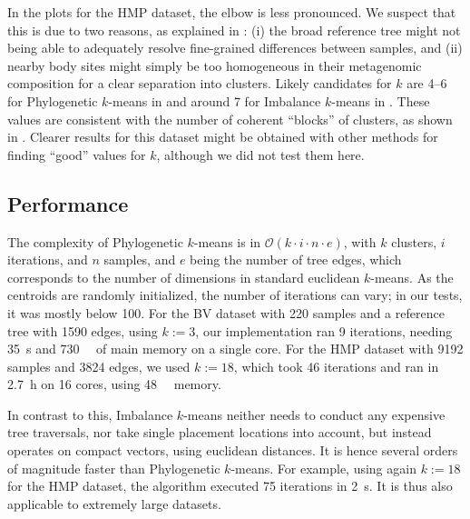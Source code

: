 In the plots for the \ac{HMP} dataset, the elbow is less pronounced.
We suspect that this is due to two reasons, as explained in :
(i) the broad reference tree might not being able to adequately resolve fine-grained differences between samples,
and (ii) nearby body sites might simply be too homogeneous in their metagenomic composition for a clear separation into clusters.
Likely candidates for $k$ are \num{4}--\num{6} for Phylogenetic $k$-means in 
and around \num{7} for Imbalance $k$-means in .
These values are consistent with the number of coherent ``blocks'' of clusters,
as shown in .
Clearer results for this dataset might be obtained with other methods for finding ``good'' values for $k$,
although we did not test them here.


\subsection{Performance}
\label{ch:Clustering:sec:Results:sub:Performance}

The complexity of Phylogenetic $k$-means is in $\mathcal{O}(k \cdot i \cdot n \cdot e)$,
with $k$ clusters, $i$ iterations, and $n$ samples, and $e$ being the number of tree edges,
which corresponds to the number of dimensions in standard euclidean $k$-means.
As the centroids are randomly initialized, the number of iterations can vary;
in our tests, it was mostly below \num{100}.
For the \ac{BV} dataset with \num{220} samples and a reference tree with \num{1 590} edges, using $k:=3$,
our implementation ran \num{9} iterations, needing \SI{35}{\second} and \SI{730}{\mega\byte} of main memory on a single core.
For the \ac{HMP} dataset with \num{9 192} samples and \num{3 824} edges, we used $k:=18$,
which took \num{46} iterations and ran in \SI{2.7}{\hour} on \num{16} cores, using \SI{48}{\giga\byte} memory.

In contrast to this, Imbalance $k$-means neither needs to conduct any expensive tree traversals,
nor take single placement locations into account,
but instead operates on compact vectors, using euclidean distances.
It is hence several orders of magnitude faster than Phylogenetic $k$-means.
For example, using again $k:=18$ for the \ac{HMP} dataset,
the algorithm executed \num{75} iterations in \SI{2}{\second}.
It is thus also applicable to extremely large datasets.

